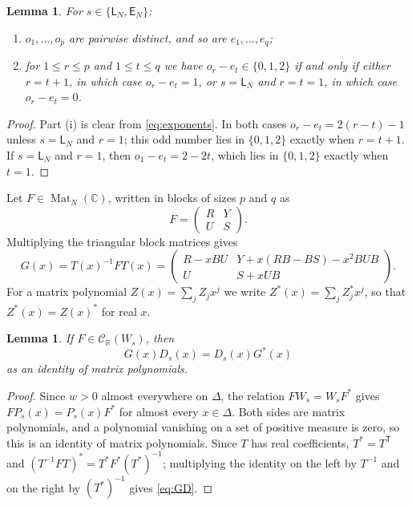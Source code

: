 \documentclass[11pt]{amsart}
\newtheorem{lemma}[theorem]{Lemma}
\theoremstyle{definition}
\theoremstyle{remark}
\numberwithin{equation}{section}
\newcommand{\C}{\mathbb{C}}
\newcommand{\R}{\mathbb{R}}
\newcommand{\Mat}{\operatorname{Mat}}
\newcommand{\CR}{\mathcal{C}_{\R}}
\newcommand{\sL}{\mathsf{L}}
\newcommand{\sE}{\mathsf{E}}
\begin{document}
\begin{lemma}\label{lem:exponents}
For $s\in\{\sL_N,\sE_N\}$:
\begin{enumerate}
\item[(i)] $o_1,\dots,o_p$ are pairwise distinct, and so are
$e_1,\dots,e_q$;
\item[(ii)] for $1\le r\le p$ and $1\le t\le q$ we have
$o_r-e_t\in\{0,1,2\}$ if and only if either $r=t+1$, in which case
$o_r-e_t=1$, or $s=\sL_N$ and $r=t=1$, in which case $o_r-e_t=0$.
\end{enumerate}
\end{lemma}

\begin{proof}
Part (i) is clear from \eqref{eq:exponents}. In both cases
$o_r-e_t=2(r-t)-1$ unless $s=\sL_N$ and $r=1$; this odd number lies in
$\{0,1,2\}$ exactly when $r=t+1$. If $s=\sL_N$ and $r=1$, then
$o_1-e_t=2-2t$, which lies in $\{0,1,2\}$ exactly when $t=1$.
\end{proof}

Let $F\in\Mat_N(\C)$, written in blocks of sizes $p$ and $q$ as
\[
F=\begin{pmatrix}R&Y\\U&S\end{pmatrix}.
\]
Multiplying the triangular block matrices gives
\begin{equation}\label{eq:G}
G(x)=T(x)^{-1}FT(x)=
\begin{pmatrix}
R-xBU & Y+x(RB-BS)-x^2BUB\\
U & S+xUB
\end{pmatrix}.
\end{equation}
For a matrix polynomial $Z(x)=\sum_jZ_jx^j$ we write
$Z^*(x)=\sum_jZ_j^*x^j$, so that $Z^*(x)=Z(x)^*$ for real $x$.

\begin{lemma}\label{lem:polyidentity}
If $F\in\CR(W_s)$, then
\begin{equation}\label{eq:GD}
G(x)D_s(x)=D_s(x)G^*(x)
\end{equation}
as an identity of matrix polynomials.
\end{lemma}

\begin{proof}
Since $w>0$ almost everywhere on $\Delta$, the relation $FW_s=W_sF^*$ gives
$FP_s(x)=P_s(x)F^*$ for almost every $x\in\Delta$. Both sides are matrix
polynomials, and a polynomial vanishing on a set of positive measure is zero,
so this is an identity of matrix polynomials. Since $T$ has real
coefficients, $T^*=T^{\mathsf T}$ and $(T^{-1}FT)^*=T^*F^*(T^*)^{-1}$;
multiplying the identity on the left by $T^{-1}$ and on the right by
$(T^*)^{-1}$ gives \eqref{eq:GD}.
\end{proof}
\end{document}
